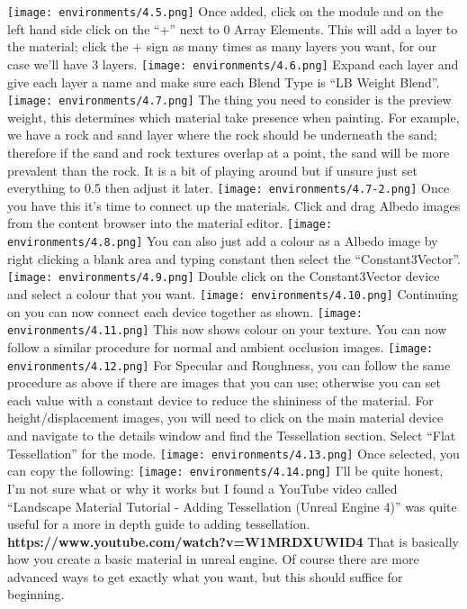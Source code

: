 \documentclass[../main.tex]{subfiles}
\begin{document}
\texttt{[image: environments/4.5.png]}
Once added, click on the module and on the left hand side click on the “+” next to 0 Array Elements. This will add a layer to the material; click the + sign as many times as many layers you want, for our case we’ll have 3 layers.
\texttt{[image: environments/4.6.png]}
Expand each layer and give each layer a name and make sure each Blend Type is “LB Weight Blend”.
\texttt{[image: environments/4.7.png]}
The thing you need to consider is the preview weight, this determines which material take presence when painting. For example, we have a rock and sand layer where the rock should be underneath the sand; therefore if the sand and rock textures overlap at a point, the sand will be more prevalent than the rock.
It is a bit of playing around but if unsure just set everything to 0.5 then adjust it later.
\texttt{[image: environments/4.7-2.png]}
Once you have this it’s time to connect up the materials.
Click and drag Albedo images from the content browser into the material editor.
\texttt{[image: environments/4.8.png]}
You can also just add a colour as a Albedo image by right clicking a blank area and typing constant then select the “Constant3Vector”.
\texttt{[image: environments/4.9.png]}
Double click on the Constant3Vector device and select a colour that you want.
\texttt{[image: environments/4.10.png]}
Continuing on you can now connect each device together as shown.
\texttt{[image: environments/4.11.png]}
This now shows colour on your texture. You can now follow a similar procedure for normal and ambient occlusion images.
\texttt{[image: environments/4.12.png]}
For Specular and Roughness, you can follow the same procedure as above if there are images that you can use; otherwise you can set each value with a constant device to reduce the shininess of the material.
For height/displacement images, you will need to click on the main material device and navigate to the details window and find the Tessellation section. Select “Flat Tessellation” for the mode.
 \texttt{[image: environments/4.13.png]}
Once selected, you can copy the following:
\texttt{[image: environments/4.14.png]}
I’ll be quite honest, I’m not sure what or why it works but I found a YouTube video called “Landscape Material Tutorial - Adding Tessellation (Unreal Engine 4)” was quite useful for a more in depth guide to adding tessellation.
\textbf{https://www.youtube.com/watch?v=W1MRDXUWID4}
That is basically how you create a basic material in unreal engine. Of course there are more advanced ways to get exactly what you want, but this should suffice for beginning.
\end{document}
